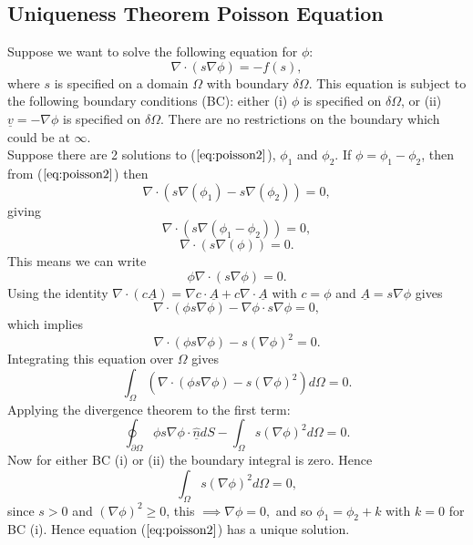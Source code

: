 \documentclass[11pt]{article}
\newcommand{\pl}{\partial}
\newcommand{\ul}{\underline}
\begin{document}
\begin{appendices}
\section{Uniqueness Theorem Poisson Equation}
\label{appendix:poisson}
Suppose we want to solve the following equation for $\phi$:
\begin{equation}
\label{eq:poisson2}
\nabla\cdot(s\nabla{\phi}) = -f(s),
\end{equation}
where $s$ is specified on a domain $\Omega$ with boundary $\delta{\Omega}$. This equation is subject to the following boundary conditions (BC):
either (i) $\phi$ is specified on $\delta{\Omega}$, or (ii) $\ul{v} = -\nabla{\phi}$ is specified on $\delta{\Omega}$.
There are no restrictions on the boundary which could be at $\infty$.\\
Suppose there are 2 solutions to ($\ref{eq:poisson2}$), $\phi_1$ and $\phi_2.$
If $\phi = \phi_1-\phi_2$, then from ($\ref{eq:poisson2}$)
then
$$\nabla\cdot(s\nabla(\phi_1)-s\nabla(\phi_2)) = 0,$$
giving $$\nabla\cdot(s\nabla(\phi_1-\phi_2)) = 0,$$
$$\nabla\cdot(s\nabla(\phi)) = 0.$$
This means we can write 
$$\phi\nabla\cdot(s\nabla{\phi}) = 0.$$
Using the identity $\nabla\cdot(c\ul{A}) = \nabla{c}\cdot\ul{A} + c\nabla\cdot{\ul{A}}$ with $c = \phi$ and $\ul{A} = s\nabla{\phi}$ gives
$$ \nabla\cdot( \phi{s}\nabla\phi ) - \nabla\phi\cdot{s}\nabla\phi = 0,$$
which implies
$$ \nabla\cdot( \phi{s}\nabla\phi ) - s(\nabla\phi)^2 = 0.$$
Integrating this equation over $\Omega$ gives
$$ \int_{\Omega}(\nabla\cdot( \phi{s}\nabla\phi ) - s(\nabla\phi)^2)d\Omega=0.$$ 
Applying the divergence theorem to the first term:
$$ \oint_{\pl{\Omega}}\phi{s}\nabla{\phi}\cdot\ul{\hat{n}}dS - \int_{\Omega}s(\nabla\phi)^2d\Omega=0.$$
Now for either BC (i) or (ii) the boundary integral is zero. Hence
$$ \int_{\Omega}s(\nabla\phi)^2d\Omega=0,$$ 
since $s>0$ and $(\nabla\phi)^2\geq 0$, this $\implies \nabla{\phi} = 0,$ and so $\phi_1 = \phi_2 + k$ with $k = 0$ for BC (i). Hence equation ($\ref{eq:poisson2}$) has a unique solution. 
\end{appendices}


\end{document}
